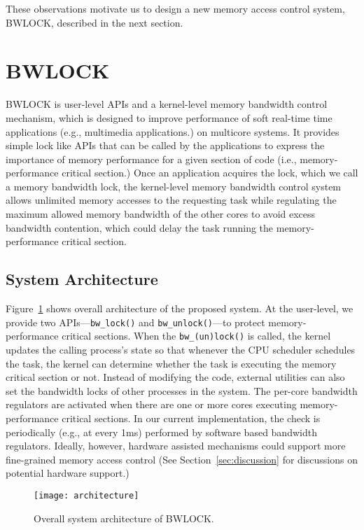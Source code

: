 \documentclass[times, 10pt,onecolumn]{article}
\begin{document}
These observations motivate us to design a new memory access control
system, BWLOCK, described in the next section.
\section{BWLOCK} \label{sec:bwlock}

BWLOCK is user-level APIs and a kernel-level memory bandwidth control
mechanism, which is designed to improve performance of soft real-time
time applications (e.g., multimedia applications.) on multicore
systems. It provides simple lock like APIs that can be called
by the applications to express the importance of memory performance
for a given section of code (i.e., memory-performance critical
section.) Once an application acquires the lock, which we call a
memory bandwidth lock, the kernel-level memory bandwidth control
system allows unlimited memory accesses to the requesting task while
regulating the maximum allowed memory bandwidth of the other cores to
avoid excess bandwidth contention, which could delay the task running the
memory-performance critical section.

\subsection{System Architecture}
Figure~\ref{fig:architecture} shows overall architecture of the
proposed system. At the user-level, we provide two
APIs---\texttt{bw\_lock()} and \texttt{bw\_unlock()}---to protect
memory-performance critical sections. When the
\texttt{bw\_(un)lock()} is called, the kernel updates the calling process's
state so that whenever the CPU scheduler schedules the task, the kernel can
determine whether the task is executing the memory critical section or
not. Instead of modifying the code, external utilities can also set
the bandwidth locks of other processes in the system.
The per-core bandwidth regulators are activated when there are one or
more cores executing memory-performance critical sections. In our
current implementation, the check is periodically (e.g., at every 1ms)
performed by software based bandwidth regulators.
Ideally, however, hardware assisted mechanisms could support more
fine-grained memory access control (See Section~\ref{sec:discussion}
for discussions on potential hardware support.)

\begin{figure} [t]
\centering
\centering
\texttt{[image: architecture]}
\caption{Overall system architecture of BWLOCK.}
\label{fig:architecture}
\end{figure}
\end{document}
